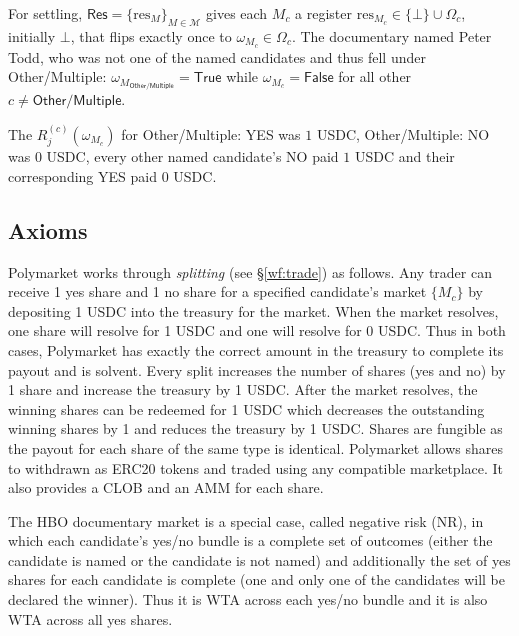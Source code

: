 For settling, $\mathsf{Res}=\{\mathrm{res}_{M}\}_{M\in\mathcal{M}}$ gives each $M_c$ a register $\mathrm{res}_{M_c}\in\{\bot\}\cup\Omega_c$, initially $\bot$, that flips exactly once to $\omega_{M_c}\in\Omega_c$. The documentary named Peter Todd, who was not one of the named candidates and thus fell under \textsf{Other/Multiple}: $\omega_{M_{\textsf{Other/Multiple}}}=\mathsf{True}$ while $\omega_{M_c}=\mathsf{False}$ for all other $c\neq\textsf{Other/Multiple}$. 

The $R^{(c)}_j(\omega_{M_c})$ for \textsf{Other/Multiple: YES} was $1$ USDC, \textsf{Other/Multiple: NO} was $0$ USDC, every other named candidate’s \textsf{NO} paid $1$ USDC and their corresponding \textsf{YES} paid $0$ USDC. 


\subsection{Axioms}

Polymarket works through \textit{splitting} (see \S\ref{wf:trade}) as follows. Any trader can receive 1 yes share and 1 no share for a specified candidate's market $\{M_c\}$  by depositing 1 USDC into the treasury for the market. When the market resolves, one share will resolve for 1 USDC and one will resolve for 0 USDC. Thus in both cases, Polymarket has exactly the correct amount in the treasury to complete its payout and is solvent. Every split increases the number of shares (yes and no) by 1 share and increase the treasury by 1 USDC. After the market resolves, the winning shares can be redeemed for 1 USDC which decreases the outstanding winning shares by 1 and reduces the treasury by 1 USDC. Shares are fungible as the payout for each share of the same type is identical. Polymarket allows shares to withdrawn as ERC20 tokens and traded using any compatible marketplace. It also provides a CLOB and an AMM for each share.

The HBO documentary market is a special case, called negative risk (NR), in which each candidate's yes/no bundle is a complete set of outcomes (either the candidate is named or the candidate is not named) and additionally the set of yes shares for each candidate is complete (one and only one of the candidates will be declared the winner). Thus it is WTA across each yes/no bundle and it is also WTA across all yes shares.

